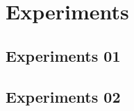 
\section{Experiments}
\label{sec:p2-experiment}

\subsection{Experiments 01}


\subsection{Experiments 02}

